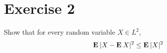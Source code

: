 \section{Exercise 2}
Show that for every random variable $X \in L^2$,
\[ \mathbf{E}\: |X-\mathbf{E}\: X|^2 \leq \mathbf{E}\: |X|^2 \]
